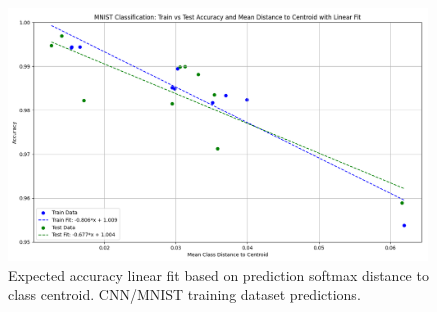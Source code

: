 \begin{figure}[ht]
    \centering
    \includegraphics[width=0.99\textwidth]{Figures/mnist_plot_accuracy_vs_distance_linear_fit.png}
    \caption{Expected accuracy linear fit based on prediction softmax distance to class centroid. CNN/MNIST training dataset predictions.}
\label{fig:mnist_plot_accuracy_vs_distance_linear_fit}
\end{figure}





